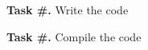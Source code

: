 \documentclass{article}
\begin{document}
\vspace*{\fill}\vspace{-5ex}

\newcommand{\tsk}{\par\addtocounter{task}{1}%
\textbf{Task \#.} }

\tsk Write the code 
\tsk Compile the code 
\vspace*{\fill}
\end{document}
